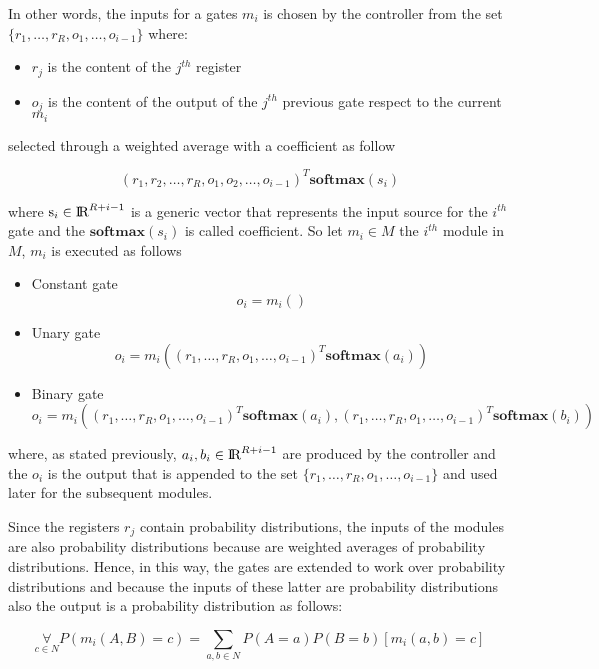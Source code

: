 In other words, the inputs for a gates $m_i$ is chosen by the controller from the set $\{r_{1}, \dots, r_{R}, o_{1}, \dots, o_{i-1}\}$ where:
\begin{itemize}
	\item $r_j$ is the content of the $j^{th}$ register
	\item $o_j$ is the content of the output of the $j^{th}$ previous gate respect to the current $m_i$
\end{itemize}
selected through a weighted average with a coefficient as follow
\begin{center}
	\begin{equation}
		(r_1, r_2, \dots, r_R, o_1, o_2, \dots, o_{i-1})^T\textbf{softmax}(s_i)
	\end{equation}
\end{center}
where $\textrm{s}_i \in \textrm{I\!R}^{R+i-1}$ is a generic vector that represents the input source for the $i^{th}$ gate and the $\textbf{softmax}(s_i)$ is called coefficient. \newline
So let $m_i \in M$ the $i^{th}$ module in $M$, $m_i$ is executed as follows
\begin{itemize}
	\item{Constant gate
		\begin{equation}
			o_i = m_i()
		\end{equation}
	}
	\item{Unary gate
		\begin{equation}
			o_i = m_i((r_1, \dots, r_R, o_1, \dots, o_{i-1})^T\textbf{softmax}(a_i))
		\end{equation}
	}
	\item{Binary gate
		\begin{equation}
			o_i = m_i((r_1, \dots, r_R, o_1, \dots, o_{i-1})^T\textbf{softmax}(a_i), (r_1, \dots, r_R, o_1, \dots, o_{i-1})^T\textbf{softmax}(b_i))
		\end{equation}
	}
\end{itemize}
where, as stated previously, $a_i, b_i \in \textrm{I\!R}^{R+i-1}$ are produced by the controller and the $o_i$ is the output that is appended to the set $\{r_{1}, \dots, r_{R}, o_{1}, \dots, o_{i-1}\}$ and used later for the subsequent modules.

Since the registers $r_j$ contain probability distributions, the inputs of the modules are also probability distributions because are weighted averages of probability distributions. Hence, in this way, the gates are extended to work over probability distributions and because the inputs of these latter are probability distributions also the output is a probability distribution as follows:
\begin{center}
	\begin{equation}
		\mathop{\forall}\limits_{c \in N} P(m_i(A, B) = c) = \sum\limits_{a,b \in N} P(A = a)P(B = b)[m_i(a, b) = c]
	\end{equation}
\end{center}

